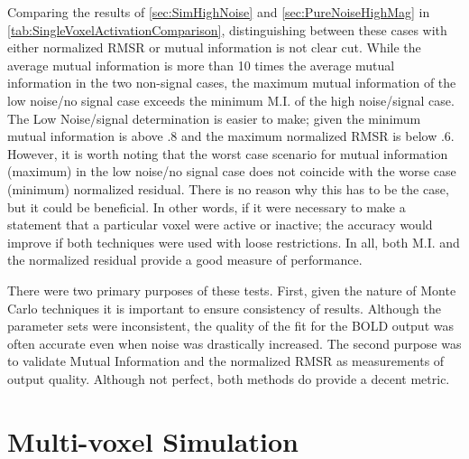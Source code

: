 Comparing the results of \autoref{sec:SimHighNoise} and 
\autoref{sec:PureNoiseHighMag}
in \autoref{tab:SingleVoxelActivationComparison},
distinguishing between these cases with either normalized \ac{RMSR} or 
mutual information is not clear cut. While the average mutual information 
is more than 10 times
the average mutual information in the two non-signal cases, the maximum
mutual information of the low noise/no signal case exceeds the minimum M.I. 
of the high noise/signal
case. The Low Noise/signal determination is easier to make; given
the minimum mutual information is above $.8$ and the maximum normalized 
\ac{RMSR} is below $.6$.
However, it is worth noting that the worst case scenario  for mutual information (maximum) in the
low noise/no signal case does not coincide with the worse case (minimum) normalized residual.
There is no reason why this has to be the case, but it could be beneficial. In
other words, if it were necessary to make a statement that
a particular voxel were active or inactive; the accuracy would improve if both techniques
were used with loose restrictions. In all, both M.I. and the normalized residual
provide a good measure of performance.

There were two primary purposes of these tests. First, given the nature of Monte Carlo
techniques it is important to ensure consistency of results. Although the parameter
sets were inconsistent, the quality of the fit for the \ac{BOLD} output was often
accurate even when noise was drastically increased. The second purpose was to validate
Mutual Information and the normalized \ac{RMSR} as measurements of output quality.
Although not perfect, both methods do provide a decent metric.

\section{Multi-voxel Simulation}
\label{sec:Multi-voxel Simulation}

